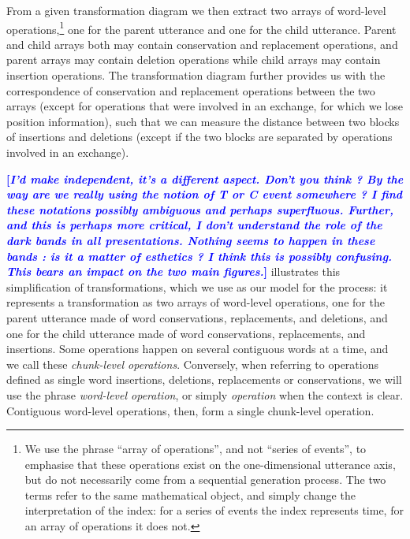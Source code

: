 \documentclass[a4paper,fleqn]{cas-dc}
\newcommand{\tb}[1]{\textcolor{blue}{#1}}
\newcommand{\rk}[1]{\tb{{\footnotesize {\bf[\emph{#1}]}}}}
\begin{document}
From a given transformation diagram we then extract two arrays of
word-level operations,\footnote{We use the phrase \enquote{array of
  operations}, and not \enquote{series of events}, to emphasise that
  these operations exist on the one-dimensional utterance axis, but do
  not necessarily come from a sequential generation process. The two
  terms refer to the same mathematical object, and simply change the
  interpretation of the index: for a series of events the index
  represents time, for an array of operations it does not.} one for the
parent utterance and one for the child utterance. Parent and child
arrays both may contain conservation and replacement operations, and
parent arrays may contain deletion operations while child arrays may
contain insertion operations. The transformation diagram further
provides us with the correspondence of conservation and replacement
operations between the two arrays (except for operations that were
involved in an exchange, for which we lose position information), such
that we can measure the distance between two blocks of insertions and
deletions (except if the two blocks are separated by operations involved
in an exchange).

\rk{I'd make  independent, it's a different aspect. Don't you think ? By the way are we really using the notion of T or C event somewhere ? I find these notations possibly ambiguous and perhaps superfluous. Further, and this is perhaps more critical, I don't understand the role of the dark bands in all presentations. Nothing seems to happen in these bands : is it a matter of esthetics ? I think this is possibly confusing. This bears an impact on the two main figures.}
 illustrates this simplification of
transformations, which we use as our model for the process: it
represents a transformation as two arrays of word-level operations, one
for the parent utterance made of word conservations, replacements, and
deletions, and one for the child utterance made of word conservations,
replacements, and insertions. Some operations happen on several
contiguous words at a time, and we call these \emph{chunk-level
operations}. Conversely, when referring to operations defined as single
word insertions, deletions, replacements or conservations, we will use
the phrase \emph{word-level operation}, or simply \emph{operation} when
the context is clear. Contiguous word-level operations, then, form a
single chunk-level operation.
\end{document}
